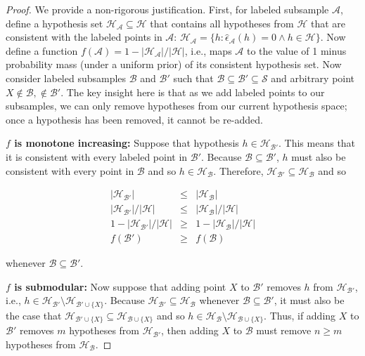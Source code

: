 \begin{proof}
We provide a non-rigorous justification. First, for labeled subsample $\mathcal{A}$, define a hypothesis set $\mathcal{H}_{\mathcal{A}} \subseteq \mathcal{H}$ that contains all hypotheses from $\mathcal{H}$ that are consistent with the labeled points in $\mathcal{A}$: $\mathcal{H}_{\mathcal{A}} = \{h : \hat{\epsilon}_{\mathcal{A}}(h)=0 \wedge h \in \mathcal{H}\}$. Now define a function $f(\mathcal{A}) = 1-|\mathcal{H}_{\mathcal{A}}| / |\mathcal{H}|$, i.e., maps $\mathcal{A}$ to the value of 1 minus probability mass (under a uniform prior) of its consistent hypothesis set. Now consider labeled subsamples $\mathcal{B}$ and $\mathcal{B}'$ such that $\mathcal{B} \subseteq \mathcal{B}' \subseteq \mathcal{S}$ and arbitrary point $X \not\in \mathcal{B}, \not\in \mathcal{B}'$. The key insight here is that as we add labeled points to our subsamples, we can only remove hypotheses from our current hypothesis space; once a hypothesis has been removed, it cannot be re-added.

\textbf{$f$ is monotone increasing:} Suppose that hypothesis $h \in \mathcal{H}_{\mathcal{B}'}$. This means that it is consistent with every labeled point in $\mathcal{B}'$. Because $\mathcal{B} \subseteq \mathcal{B}'$, $h$ must also be consistent with every point in $\mathcal{B}$ and so $h \in \mathcal{H}_{\mathcal{B}}$. Therefore, $\mathcal{H}_{\mathcal{B}'} \subseteq \mathcal{H}_{\mathcal{B}}$ and so

\begin{eqnarray*}
|\mathcal{H}_{\mathcal{B}'}| &\leq& |\mathcal{H}_{\mathcal{B}}| \\
|\mathcal{H}_{\mathcal{B}'}| / |\mathcal{H}| &\leq& |\mathcal{H}_{\mathcal{B}}| / |\mathcal{H}| \\
1-|\mathcal{H}_{\mathcal{B}'}| / |\mathcal{H}| &\geq& 1-|\mathcal{H}_{\mathcal{B}}| / |\mathcal{H}| \\
f(\mathcal{B}') &\geq& f(\mathcal{B})
\end{eqnarray*}

\noindent whenever $\mathcal{B} \subseteq \mathcal{B}'$.

\textbf{$f$ is submodular:} Now suppose that adding point $X$ to $\mathcal{B}'$ removes $h$ from $\mathcal{H}_{\mathcal{B}'}$, i.e., $h \in \mathcal{H}_{\mathcal{B}'} \setminus \mathcal{H}_{\mathcal{B}' \cup \{X\}}$. Because $\mathcal{H}_{\mathcal{B}'} \subseteq \mathcal{H}_{\mathcal{B}}$ whenever $\mathcal{B} \subseteq \mathcal{B}'$, it must also be the case that $\mathcal{H}_{\mathcal{B}' \cup \{X\}} \subseteq \mathcal{H}_{\mathcal{B} \cup \{X\}}$ and so $h \in \mathcal{H}_{\mathcal{B}} \setminus \mathcal{H}_{\mathcal{B} \cup \{X\}}$. Thus, if adding $X$ to $\mathcal{B}'$ removes $m$ hypotheses from $\mathcal{H}_{\mathcal{B}'}$, then adding $X$ to $\mathcal{B}$ must remove $n \geq m$ hypotheses from $\mathcal{H}_{\mathcal{B}}$.


\end{proof}
